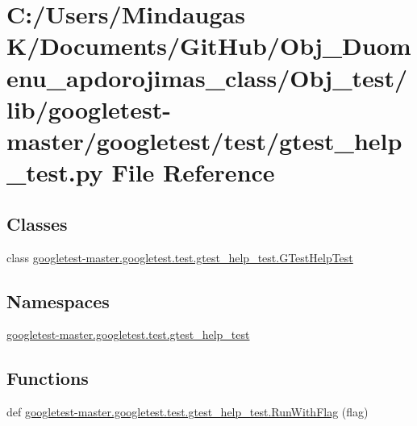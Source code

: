 \hypertarget{_obj__test_2lib_2googletest-master_2googletest_2test_2gtest__help__test_8py}{}\section{C\+:/\+Users/\+Mindaugas K/\+Documents/\+Git\+Hub/\+Obj\+\_\+\+Duomenu\+\_\+apdorojimas\+\_\+class/\+Obj\+\_\+test/lib/googletest-\/master/googletest/test/gtest\+\_\+help\+\_\+test.py File Reference}
\label{_obj__test_2lib_2googletest-master_2googletest_2test_2gtest__help__test_8py}
\subsection*{Classes}
\begin{DoxyCompactItemize}
\item 
class \mbox{\hyperlink{classgoogletest-master_1_1googletest_1_1test_1_1gtest__help__test_1_1_g_test_help_test}{googletest-\/master.\+googletest.\+test.\+gtest\+\_\+help\+\_\+test.\+G\+Test\+Help\+Test}}
\end{DoxyCompactItemize}
\subsection*{Namespaces}
\begin{DoxyCompactItemize}
\item 
 \mbox{\hyperlink{namespacegoogletest-master_1_1googletest_1_1test_1_1gtest__help__test}{googletest-\/master.\+googletest.\+test.\+gtest\+\_\+help\+\_\+test}}
\end{DoxyCompactItemize}
\subsection*{Functions}
\begin{DoxyCompactItemize}
\item 
def \mbox{\hyperlink{namespacegoogletest-master_1_1googletest_1_1test_1_1gtest__help__test_a91837c8d06174e359cbc7f0b063f478f}{googletest-\/master.\+googletest.\+test.\+gtest\+\_\+help\+\_\+test.\+Run\+With\+Flag}} (flag)
\end{DoxyCompactItemize}
